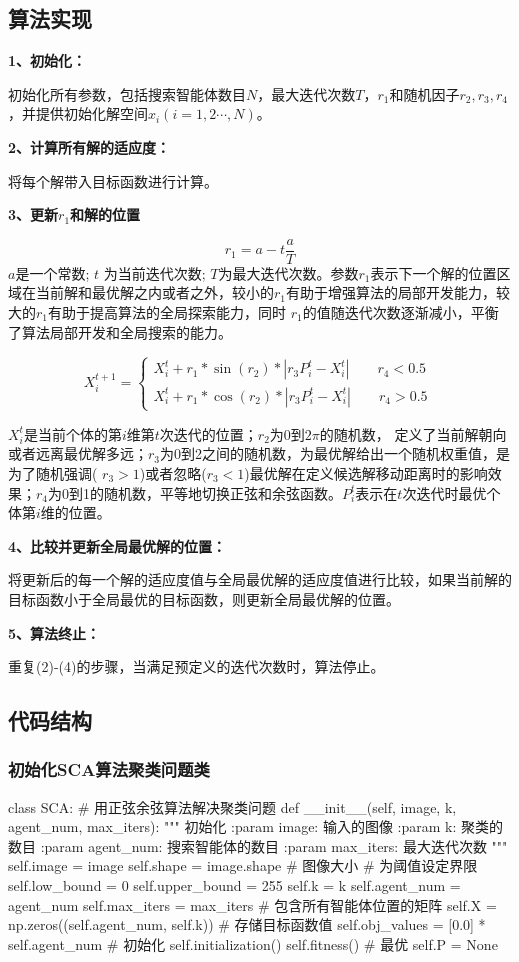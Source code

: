 \documentclass{article}
\begin{document}
\subsection{算法实现}

\textbf{1、初始化：}

初始化所有参数，包括搜索智能体数目$N$，最大迭代次数$T$，$r_1$和随机因子$r_2,r_3,r_4$，并提供初始化解空间$x_i(i=1,2\cdots,N)$。

\textbf{2、计算所有解的适应度：}

将每个解带入目标函数进行计算。

\textbf{3、更新$r_1$和解的位置}

$$r_1=a-t\frac{a}{T}$$
$a$是一个常数; $t$ 为当前迭代次数; $T$为最大迭代次数。参数$r_1$表示下一个解的位置区域在当前解和最优解之内或者之外，较小的$r_1$有助于增强算法的局部开发能力，较大的$r_1$有助于提高算法的全局探索能力，同时 $r_1$的值随迭代次数逐渐减小，平衡了算法局部开发和全局搜索的能力。

$$X_i^{t+1}=\begin{cases}
	X_i^t+r_1*\sin(r_2)*|r_3P_i^t-X_i^t|\qquad r_4<0.5\\
	X_i^t+r_1*\cos(r_2)*|r_3P_i^t-X_i^t|\qquad r_4>0.5\
\end{cases}$$

$X_i^t$是当前个体的第$i$维第$t$次迭代的位置；$r_2$为0到$2\pi$的随机数，
定义了当前解朝向或者远离最优解多远；$r_3$为0到2之间的随机数，为最优解给出一个随机权重值，是为了随机强调( $r_3 >1 $)或者忽略($r_3 <1 $)最优解在定义候选解移动距离时的影响效果；$r_4$为0到1的随机数，平等地切换正弦和余弦函数。$P_i^t$表示在$t$次迭代时最优个体第$i$维的位置。

\textbf{4、比较并更新全局最优解的位置：}

将更新后的每一个解的适应度值与全局最优解的适应度值进行比较，如果当前解的目标函数小于全局最优的目标函数，则更新全局最优解的位置。

\textbf{5、算法终止：}

重复(2)-(4)的步骤，当满足预定义的迭代次数时，算法停止。

\subsection{代码结构}
\subsubsection{初始化SCA算法聚类问题类}
\begin{python}
	class SCA:
		 # 用正弦余弦算法解决聚类问题
		 def __init__(self, image, k, agent_num, max_iters):
		 """
		 初始化
		 :param image: 输入的图像
		 :param k: 聚类的数目
		 :param agent_num: 搜索智能体的数目
		 :param max_iters: 最大迭代次数
		 """
		 self.image = image
		 self.shape = image.shape  # 图像大小
		 # 为阈值设定界限
		 self.low_bound = 0
		 self.upper_bound = 255
		 self.k = k
		 self.agent_num = agent_num
		 self.max_iters = max_iters
		 # 包含所有智能体位置的矩阵
		 self.X = np.zeros((self.agent_num, self.k))
		 # 存储目标函数值
		 self.obj_values = [0.0] * self.agent_num
		 # 初始化
	 	 self.initialization()
		 self.fitness()
		 # 最优
		 self.P = None
\end{python}
\end{document}
